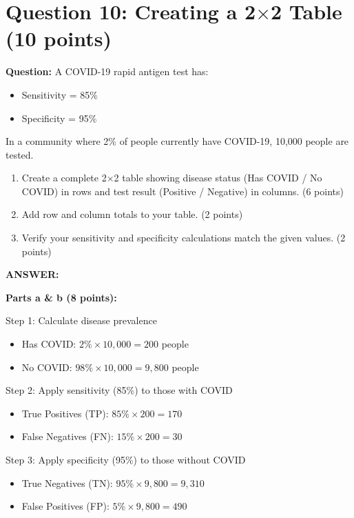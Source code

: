 \documentclass[11pt]{article}
\begin{document}
\vspace{0.3cm}
\noindent\hrulefill

\section*{Question 10: Creating a 2$\times$2 Table (10 points)}

\textbf{Question:} A COVID-19 rapid antigen test has:
\begin{itemize}
    \item Sensitivity = 85\%
    \item Specificity = 95\%
\end{itemize}

In a community where 2\% of people currently have COVID-19, 10,000 people are tested.

\begin{enumerate}
    \item[a)] Create a complete 2$\times$2 table showing disease status (Has COVID / No COVID) in rows and test result (Positive / Negative) in columns. (6 points)
    \item[b)] Add row and column totals to your table. (2 points)
    \item[c)] Verify your sensitivity and specificity calculations match the given values. (2 points)
\end{enumerate}

\textbf{ANSWER:}

\textbf{Parts a \& b (8 points):}

Step 1: Calculate disease prevalence
\begin{itemize}
    \item Has COVID: $2\% \times 10{,}000 = 200$ people
    \item No COVID: $98\% \times 10{,}000 = 9{,}800$ people
\end{itemize}

Step 2: Apply sensitivity (85\%) to those with COVID
\begin{itemize}
    \item True Positives (TP): $85\% \times 200 = 170$
    \item False Negatives (FN): $15\% \times 200 = 30$
\end{itemize}

Step 3: Apply specificity (95\%) to those without COVID
\begin{itemize}
    \item True Negatives (TN): $95\% \times 9{,}800 = 9{,}310$
    \item False Positives (FP): $5\% \times 9{,}800 = 490$
\end{itemize}
\end{document}
